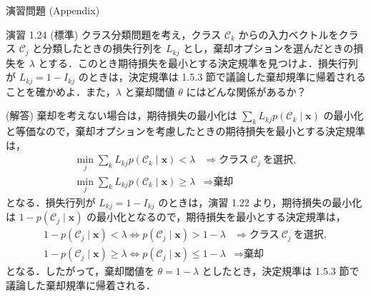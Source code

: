 \documentclass[uplatex,11pt,dvipdfmx,aspectratio=169,unicode,t]{beamer}
\numberwithin{equation}{section}
\newcommand{\CC}{\mathcal{C}}
\newcommand{\bs}[1]{\boldsymbol{#1}}
\newcommand{\1}{\bs{1}}
\newcommand{\0}{\bs{0}}
\begin{document}
\begin{frame}{演習問題 (Appendix)}
    \fontsize{7pt}{0cm}\selectfont
    \begin{block}{演習 1.24 (標準) }
        クラス分類問題を考え，クラス $\CC_{k}$ からの入力ベクトルをクラス $\CC_{j}$ と分類したときの損失行列を $L_{kj}$ とし，棄却オプションを選んだときの損失を $\lambda$ とする．このとき期待損失を最小とする決定規準を見つけよ．損失行列が $L_{kj} = 1 - I_{kj}$ のときは，決定規準は 1.5.3 節で議論した棄却規準に帰着されることを確かめよ．また，$\lambda$ と棄却閾値 $\theta$ にはどんな関係があるか？
    \end{block}
    (解答) 棄却を考えない場合は，期待損失の最小化は $\sum_{k} L_{kj} p(\CC_{k} \mid \bs{x})$ の最小化と等価なので，棄却オプションを考慮したときの期待損失を最小とする決定規準は，
    \begin{align}
        \min_{j} \sum_{k} L_{kj} p(\CC_{k} \mid \bs{x}) < \lambda &\Longrightarrow \text{クラス}\ \CC_{j}\ \text{を選択}, \\
        \min_{j} \sum_{k} L_{kj} p(\CC_{k} \mid \bs{x}) \ge \lambda &\Longrightarrow \text{棄却}
    \end{align}
    となる．損失行列が $L_{kj} = 1 - I_{kj}$ のときは，演習 1.22 より，期待損失の最小化は $1 - p(\CC_{j} \mid \bs{x})$ の最小化となるので，期待損失を最小とする決定規準は，
    \begin{align}
        1 - p(\CC_{j} \mid \bs{x}) < \lambda \iff p(\CC_{j} \mid \bs{x}) > 1 - \lambda &\Longrightarrow \text{クラス}\ \CC_{j}\ \text{を選択}, \\
        1 - p(\CC_{j} \mid \bs{x}) \ge \lambda \iff p(\CC_{j} \mid \bs{x}) \le 1 - \lambda &\Longrightarrow \text{棄却}
    \end{align}
    となる．したがって，棄却閾値を $\theta = 1 - \lambda$ としたとき，決定規準は 1.5.3 節で議論した棄却規準に帰着される．
\end{frame}
\end{document}
